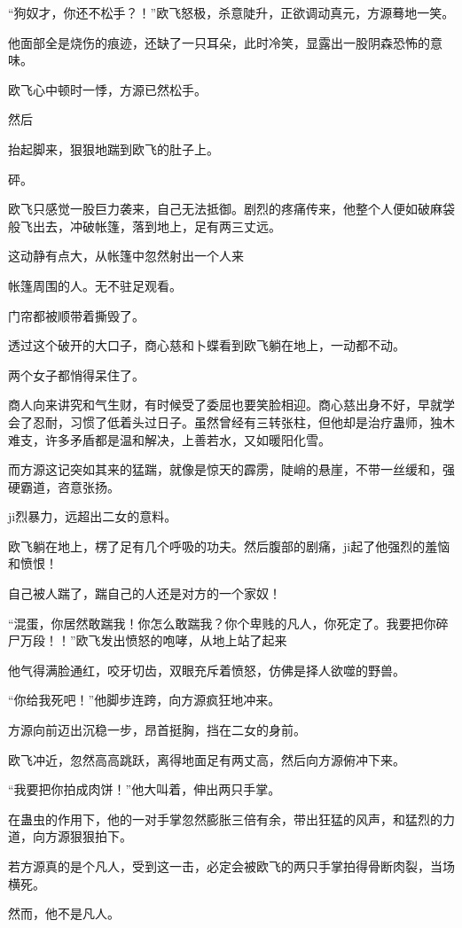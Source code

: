 \begin{this_body}
“狗奴才，你还不松手？！”欧飞怒极，杀意陡升，正欲调动真元，方源蓦地一笑。

他面部全是烧伤的痕迹，还缺了一只耳朵，此时冷笑，显露出一股阴森恐怖的意味。

欧飞心中顿时一悸，方源已然松手。

然后

抬起脚来，狠狠地踹到欧飞的肚子上。

砰。

欧飞只感觉一股巨力袭来，自己无法抵御。剧烈的疼痛传来，他整个人便如破麻袋般飞出去，冲破帐篷，落到地上，足有两三丈远。

这动静有点大，从帐篷中忽然射出一个人来

帐篷周围的人。无不驻足观看。

门帘都被顺带着撕毁了。

透过这个破开的大口子，商心慈和卜蝶看到欧飞躺在地上，一动都不动。

两个女子都悄得呆住了。

商人向来讲究和气生财，有时候受了委屈也要笑脸相迎。商心慈出身不好，早就学会了忍耐，习惯了低着头过日子。虽然曾经有三转张柱，但他却是治疗蛊师，独木难支，许多矛盾都是温和解决，上善若水，又如暖阳化雪。

而方源这记突如其来的猛踹，就像是惊天的霹雳，陡峭的悬崖，不带一丝缓和，强硬霸道，咨意张扬。

ji烈暴力，远超出二女的意料。

欧飞躺在地上，楞了足有几个呼吸的功夫。然后腹部的剧痛，ji起了他强烈的羞恼和愤恨！

自己被人踹了，踹自己的人还是对方的一个家奴！

“混蛋，你居然敢踹我！你怎么敢踹我？你个卑贱的凡人，你死定了。我要把你碎尸万段！！”欧飞发出愤怒的咆哮，从地上站了起来

他气得满脸通红，咬牙切齿，双眼充斥着愤怒，仿佛是择人欲噬的野兽。

“你给我死吧！”他脚步连跨，向方源疯狂地冲来。

方源向前迈出沉稳一步，昂首挺胸，挡在二女的身前。

欧飞冲近，忽然高高跳跃，离得地面足有两丈高，然后向方源俯冲下来。

“我要把你拍成肉饼！”他大叫着，伸出两只手掌。

在蛊虫的作用下，他的一对手掌忽然膨胀三倍有余，带出狂猛的风声，和猛烈的力道，向方源狠狠拍下。

若方源真的是个凡人，受到这一击，必定会被欧飞的两只手掌拍得骨断肉裂，当场横死。

然而，他不是凡人。


\end{this_body}
